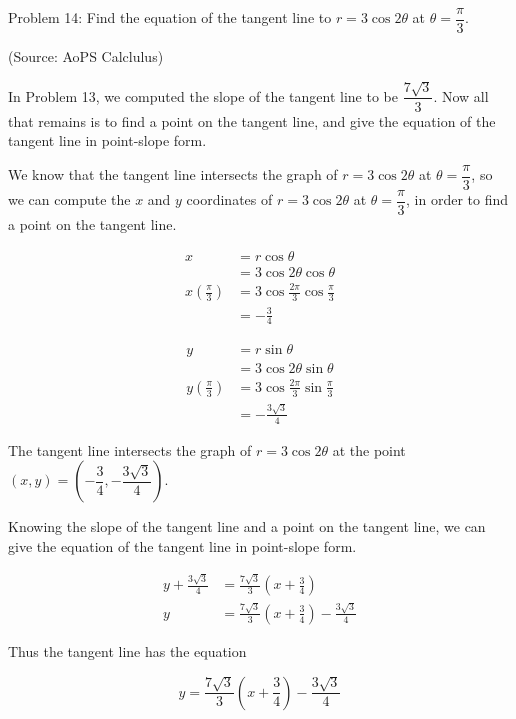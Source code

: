 Problem 14: Find the equation of the tangent line to $r = 3 \cos 2\theta$ at $\theta = \dfrac{\pi}{3}$.

(Source: AoPS Calclulus)

In Problem 13, we computed the slope of the tangent line to be $\dfrac{7 \sqrt 3}{3}$. Now all that remains is to find a point on the tangent line, and give the equation of the tangent line in point-slope form.

We know that the tangent line intersects the graph of $r = 3 \cos 2\theta$ at $\theta = \dfrac{\pi}{3}$, so we can compute the $x$ and $y$ coordinates of $r = 3 \cos 2\theta$ at $\theta = \dfrac{\pi}{3}$, in order to find a point on the tangent line.

\begin{align*}
x &= r \cos \theta \\
&= 3 \cos 2\theta \cos \theta \\
x\left(\frac{\pi}{3}\right) &= 3 \cos \frac{2\pi}{3} \cos \frac{\pi}{3} \\
&= -\frac{3}{4}
\end{align*}

\begin{align*}
y &= r \sin \theta \\
&= 3 \cos 2\theta \sin \theta \\
y\left(\frac{\pi}{3}\right) &= 3 \cos \frac{2\pi}{3} \sin \frac{\pi}{3} \\
&= -\frac{3\sqrt3}{4}
\end{align*}

The tangent line intersects the graph of $r = 3 \cos 2\theta$ at the point $\left(x, y\right) = \left(-\dfrac{3}{4}, -\dfrac{3\sqrt3}{4}\right)$.

Knowing the slope of the tangent line and a point on the tangent line, we can give the equation of the tangent line in point-slope form.

\begin{align*}
y + \frac{3\sqrt3}{4} &= \frac{7 \sqrt 3}{3} \left(x + \frac{3}{4}\right) \\
y &= \frac{7 \sqrt 3}{3} \left(x + \frac{3}{4}\right) - \frac{3\sqrt3}{4}
\end{align*}

Thus the tangent line has the equation

$$ \boxed{y = \frac{7 \sqrt 3}{3} \left(x + \frac{3}{4}\right) - \frac{3\sqrt3}{4}} $$
